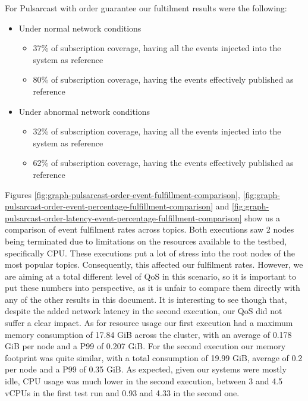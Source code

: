 For Pulsarcast with order guarantee our fultilment results were the following:
\begin{itemize}
\item Under normal network conditions
\begin{itemize}
  \item 37\% of subscription coverage, having all the events injected into the system as reference
  \item 80\% of subscription coverage, having the events effectively published as reference
\end{itemize}
\item Under abnormal network conditions
\begin{itemize}
  \item 32\% of subscription coverage, having all the events injected into the system as reference
  \item 62\% of subscription coverage, having the events effectively published as reference
\end{itemize}
\end{itemize}

Figures \ref{fig:graph-pulsarcast-order-event-fulfillment-comparison},
\ref{fig:graph-pulsarcast-order-event-percentage-fulfillment-comparison} and
\ref{fig:graph-pulsarcast-order-latency-event-percentage-fulfillment-comparison} show
us a comparison of event fulfilment rates across topics. Both executions saw 2
nodes being terminated due to limitations on the resources available to the
testbed, specifically CPU. These executions put a lot of stress into the root
nodes of the most popular topics. Consequently, this affected our fulfilment
rates. However, we are aiming at a total different level of QoS in this
scenario, so it is important to put these numbers into perspective, as it is
unfair to compare them directly with any of the other results in this document.
It is interesting to see though that, despite the added network latency in the
second execution, our QoS did not suffer a clear impact. As for resource usage
our first execution had a maximum memory consumption of 17.84 GiB across the
cluster, with an average of 0.178 GiB per node and a P99 of 0.207 GiB. For the
second execution our memory footprint was quite similar, with a total
consumption of 19.99 GiB, average of 0.2 per node and a P99 of 0.35 GiB. As
expected, given our systems were mostly idle, CPU usage was much lower in the
second execution, between 3 and 4.5 vCPUs in the first test run and 0.93 and
4.33 in the second one.

